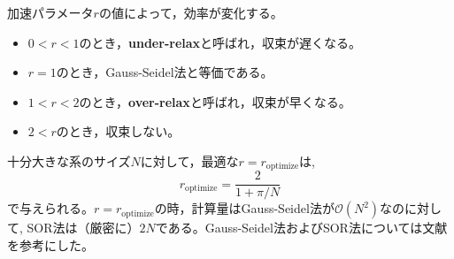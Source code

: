 \documentclass[autodetect-engine,dvi=dvipdfmx,a4paper,ja=standard,oneside,openany,11pt,draft]{bxjsbook}
\begin{document}
加速パラメータ$r$の値によって，効率が変化する。
\begin{itemize}
  \item $0<r<1$のとき，\textbf{under-relax}と呼ばれ，収束が遅くなる。
  \item $r=1$のとき，Gauss-Seidel法と等価である。
  \item $1<r<2$のとき，\textbf{over-relax}と呼ばれ，収束が早くなる。
  \item $2<r$のとき，収束しない。
\end{itemize}
十分大きな系のサイズ$N$に対して，最適な$r=r_{\mathrm{optimize}}$は,
\begin{equation}
  r_{\mathrm{optimize}}=\frac{2}{1+\pi/N}
  \label{eq:optimaze_r}
\end{equation}
で与えられる。$r=r_{\mathrm{optimize}}$の時，計算量はGauss-Seidel法が$\mathcal{O}(N^2)$なのに対して, SOR法は（厳密に）$2N$である。Gauss-Seidel法およびSOR法については文献\cite{hinch2020numerical}を参考にした。

\ifdraft{
  
  
}{}
\end{document}
